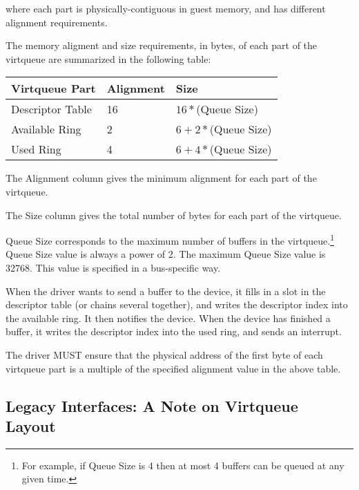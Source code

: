 where each part is physically-contiguous in guest memory,
and has different alignment requirements.

The memory aligment and size requirements, in bytes, of each part of the
virtqueue are summarized in the following table:

\begin{tabular}{|l|l|l|}
\hline
Virtqueue Part    & Alignment & Size \\
\hline \hline
Descriptor Table  & 16        & $16 * $(Queue Size) \\
\hline
Available Ring    & 2         & $6 + 2 * $(Queue Size) \\
 \hline
Used Ring         & 4         & $6 + 4 * $(Queue Size) \\
 \hline
\end{tabular}

The Alignment column gives the minimum alignment for each part
of the virtqueue.

The Size column gives the total number of bytes for each
part of the virtqueue.

Queue Size corresponds to the maximum number of buffers in the
virtqueue.\footnote{For example, if Queue Size is 4 then at most 4 buffers
can be queued at any given time.}  Queue Size value is always a
power of 2.  The maximum Queue Size value is 32768.  This value
is specified in a bus-specific way.

When the driver wants to send a buffer to the device, it fills in
a slot in the descriptor table (or chains several together), and
writes the descriptor index into the available ring.  It then
notifies the device. When the device has finished a buffer, it
writes the descriptor index into the used ring, and sends an interrupt.

The driver MUST ensure that the physical address of the first byte
of each virtqueue part is a multiple of the specified alignment value
in the above table.

\subsection{Legacy Interfaces: A Note on Virtqueue Layout}\label{sec:Basic Facilities of a Virtio Device / Virtqueues / Legacy Interfaces: A Note on Virtqueue Layout}


